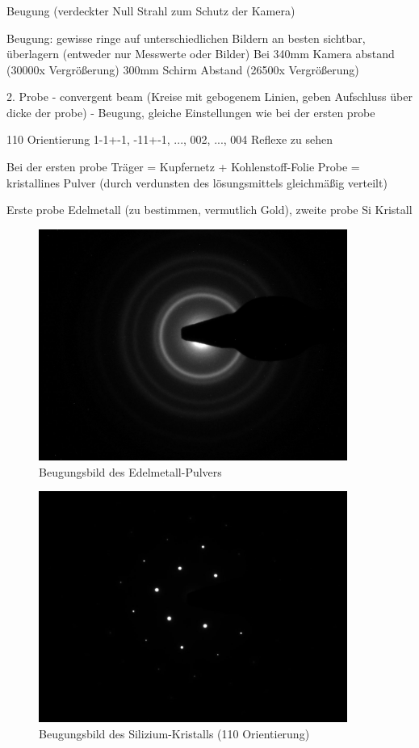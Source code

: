 \subsubsection{}
Beugung (verdeckter Null Strahl zum Schutz der Kamera)

Beugung: gewisse ringe auf unterschiedlichen Bildern an besten sichtbar, überlagern (entweder nur Messwerte oder Bilder)
Bei 340mm Kamera abstand (30000x Vergrößerung)
300mm Schirm Abstand (26500x Vergrößerung)


2. Probe
- convergent beam (Kreise mit gebogenem Linien, geben Aufschluss über dicke der probe)
- Beugung, gleiche Einstellungen wie bei der ersten probe

110 Orientierung
1-1+-1, -11+-1, ..., 002, ..., 004 Reflexe zu sehen


Bei der ersten probe
Träger = Kupfernetz + Kohlenstoff-Folie
Probe = kristallines Pulver (durch verdunsten des lösungsmittels gleichmäßig verteilt)

Erste probe Edelmetall (zu bestimmen, vermutlich Gold), zweite probe Si Kristall


\begin{figure}[p]
	\centering
	\includegraphics[width=0.9\textwidth]{data/Im_10.jpg}
	\caption{Beugungsbild des Edelmetall-Pulvers}		\label{fig:Edel}
\end{figure}

\begin{figure}[p]
	\centering
	\includegraphics[width=0.9\textwidth]{data/Im_22.jpg}
	\caption{Beugungsbild des Silizium-Kristalls (110 Orientierung)}	\label{fig:Si}
	\vspace{-5em}
\end{figure}
